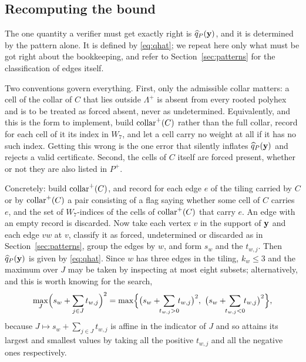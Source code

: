 \documentclass[11pt]{article}
\newcommand\collarp{\opk{collar}^{+}}
\theoremstyle{definition}
\begin{document}
\subsection{Recomputing the bound}\label{app:qhat}

The one quantity a verifier must get exactly right is $\widehat q_P({\mathbf y})$,
and it is determined by the pattern alone.  It is defined by \eqref{eq:qhat};
we repeat here only what must be got right about the bookkeeping, and refer
to Section~\ref{sec:patterns} for the classification of edges itself.

Two conventions govern everything.  First, only the admissible collar
matters: a cell of the collar of $C$ that lies outside $\Lambda^{+}$ is
absent from every rooted polyhex and is to be treated as forced absent, never
as undetermined.  Equivalently, and this is the form to implement, build
$\collarp(C)$ rather than the full collar, record for each cell of it its
index in $W_7$, and let a cell carry no weight at all if it has no such
index.  Getting this wrong is the one error that silently inflates
$\widehat q_P({\mathbf y})$ and rejects a valid certificate.  Second, the cells of
$C$ itself are forced present, whether or not they are also listed in
$P^{+}$.

Concretely: build $\collarp(C)$, and record for each edge $e$ of the tiling
carried by $C$ or by $\collarp(C)$ a pair consisting of a flag saying whether
some cell of $C$ carries $e$, and the set of $W_7$-indices of the cells of
$\collarp(C)$ that carry $e$.  An edge with an empty record is discarded.
Now take each vertex $v$ in the support of ${\mathbf y}$ and each edge $vw$ at $v$,
classify it as forced, undetermined or discarded as in
Section~\ref{sec:patterns}, group the edges by $w$, and form $s_w$ and the
$t_{w,j}$.  Then $\widehat q_P({\mathbf y})$ is given by \eqref{eq:qhat}.  Since $w$
has three edges in the tiling, $k_w\le3$ and the maximum over $J$ may be
taken by inspecting at most eight subsets; alternatively, and this is worth
knowing for the search,
\begin{equation}\label{eq:qhat-twoway}
 \max_{J}\Bigl(s_w+\sum_{j\in J}t_{w,j}\Bigr)^{2}
 =\max\Bigl\{\bigl(s_w+\!\!\sum_{t_{w,j}>0}\!\!t_{w,j}\bigr)^{2},\
             \bigl(s_w+\!\!\sum_{t_{w,j}<0}\!\!t_{w,j}\bigr)^{2}\Bigr\},
\end{equation}
because $J\mapsto s_w+\sum_{j\in J}t_{w,j}$ is affine in the indicator of $J$
and so attains its largest and smallest values by taking all the positive
$t_{w,j}$ and all the negative ones respectively.
\end{document}

